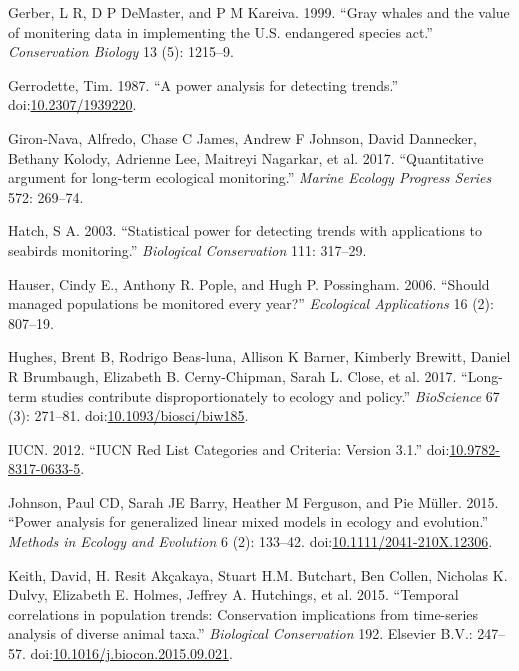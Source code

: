 \documentclass[12pt,]{article}
\begin{document}
\hypertarget{ref-Gerber1999}{}
Gerber, L R, D P DeMaster, and P M Kareiva. 1999. ``Gray whales and the
value of monitering data in implementing the U.S. endangered species
act.'' \emph{Conservation Biology} 13 (5): 1215--9.

\hypertarget{ref-Gerrodette1987}{}
Gerrodette, Tim. 1987. ``A power analysis for detecting trends.''
doi:\href{https://doi.org/10.2307/1939220}{10.2307/1939220}.

\hypertarget{ref-Giron-Nava2017}{}
Giron-Nava, Alfredo, Chase C James, Andrew F Johnson, David Dannecker,
Bethany Kolody, Adrienne Lee, Maitreyi Nagarkar, et al. 2017.
``Quantitative argument for long-term ecological monitoring.''
\emph{Marine Ecology Progress Series} 572: 269--74.

\hypertarget{ref-Hatch2003}{}
Hatch, S A. 2003. ``Statistical power for detecting trends with
applications to seabirds monitoring.'' \emph{Biological Conservation}
111: 317--29.

\hypertarget{ref-Hauser2006}{}
Hauser, Cindy E., Anthony R. Pople, and Hugh P. Possingham. 2006.
``Should managed populations be monitored every year?'' \emph{Ecological
Applications} 16 (2): 807--19.

\hypertarget{ref-Hughes2017}{}
Hughes, Brent B, Rodrigo Beas-luna, Allison K Barner, Kimberly Brewitt,
Daniel R Brumbaugh, Elizabeth B. Cerny-Chipman, Sarah L. Close, et al.
2017. ``Long-term studies contribute disproportionately to ecology and
policy.'' \emph{BioScience} 67 (3): 271--81.
doi:\href{https://doi.org/10.1093/biosci/biw185}{10.1093/biosci/biw185}.

\hypertarget{ref-IUCN2012}{}
IUCN. 2012. ``IUCN Red List Categories and Criteria: Version 3.1.''
doi:\href{https://doi.org/10.9782-8317-0633-5}{10.9782-8317-0633-5}.

\hypertarget{ref-Johnson2015}{}
Johnson, Paul CD, Sarah JE Barry, Heather M Ferguson, and Pie Müller.
2015. ``Power analysis for generalized linear mixed models in ecology
and evolution.'' \emph{Methods in Ecology and Evolution} 6 (2): 133--42.
doi:\href{https://doi.org/10.1111/2041-210X.12306}{10.1111/2041-210X.12306}.

\hypertarget{ref-Keith2015}{}
Keith, David, H. Resit Akçakaya, Stuart H.M. Butchart, Ben Collen,
Nicholas K. Dulvy, Elizabeth E. Holmes, Jeffrey A. Hutchings, et al.
2015. ``Temporal correlations in population trends: Conservation
implications from time-series analysis of diverse animal taxa.''
\emph{Biological Conservation} 192. Elsevier B.V.: 247--57.
doi:\href{https://doi.org/10.1016/j.biocon.2015.09.021}{10.1016/j.biocon.2015.09.021}.
\end{document}
